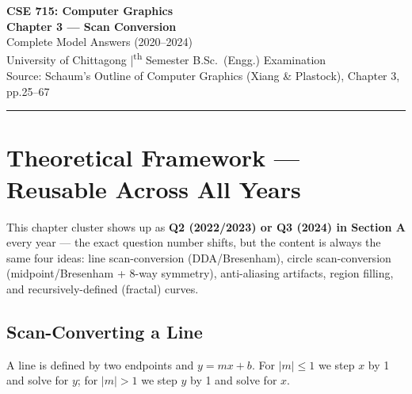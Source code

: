 \documentclass[12pt, a4paper]{article}
\begin{document}

\begin{center}
  {\LARGE\bfseries\color{sectionblue} CSE 715: Computer Graphics}\\[0.6em]
  {\Large\bfseries Chapter 3 --- Scan Conversion}\\[0.3em]
  {\large Complete Model Answers (2020--2024)}\\[0.2em]
  {\normalsize University of Chittagong \quad|\textsuperscript{th} Semester B.Sc.\ (Engg.) Examination}\\[0.3em]
  {\small Source: Schaum's Outline of Computer Graphics (Xiang \& Plastock), Chapter 3, pp.25--67}
\end{center}

\vspace{0.3em}
\noindent\rule{\linewidth}{1pt}
\vspace{0.5em}

\tableofcontents
\newpage

\section{Theoretical Framework --- Reusable Across All Years}
This chapter cluster shows up as \textbf{Q2 (2022/2023) or Q3 (2024) in Section A} every year --- the exact question number shifts, but the content is always the same four ideas: line scan-conversion (DDA/Bresenham), circle scan-conversion (midpoint/Bresenham + 8-way symmetry), anti-aliasing artifacts, region filling, and recursively-defined (fractal) curves.

\subsection{Scan-Converting a Line}
A line is defined by two endpoints and $y = mx+b$. For $|m|\le 1$ we step $x$ by 1 and solve for $y$; for $|m|>1$ we step $y$ by 1 and solve for $x$.
\end{document}
